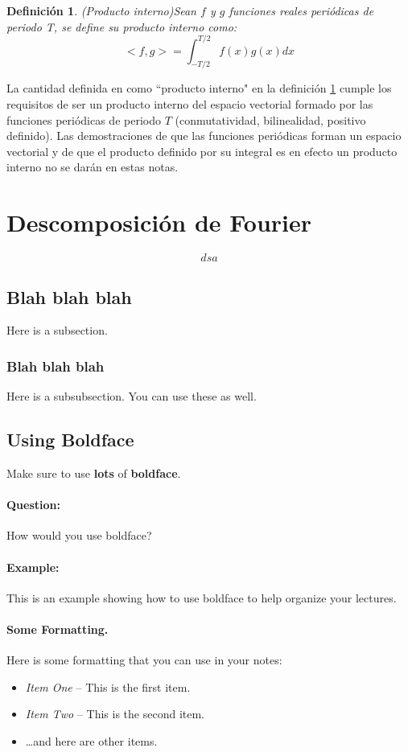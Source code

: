 \documentclass[11pt]{article}
\newtheorem{definition}[theorem]{Definición}
\begin{document}
\begin{definition}(Producto interno)\label{producto}
	Sean $f$ y $g$ funciones reales periódicas de periodo T, se define su producto interno como: 
	\[ <f,g> = \int_{-T/2}^{T/2} f(x) g(x) dx \]
\end{definition}

La cantidad definida en como ``producto interno" en la definición \ref{producto} cumple los requisitos de ser un producto interno 
del espacio vectorial formado por las funciones periódicas de periodo $T$ (conmutatividad, bilinealidad, positivo definido). 
Las demostraciones de que las funciones periódicas forman un espacio vectorial 
y de que el producto definido por su integral es en efecto un producto interno 
no se darán en estas notas.

\section{Descomposición de Fourier}

\begin{equation}
	dsa
\end{equation}


\subsection{Blah blah blah}
Here is a subsection.

\subsubsection{Blah blah blah}
Here is a subsubsection. You can use these as well.

\subsection{Using Boldface}
Make sure to use \textbf{lots} of {\bf boldface}.

\paragraph{Question:}
How would you use boldface?

\paragraph{Example:}
This is an example showing how to use boldface to 
help organize your lectures.


\paragraph{Some Formatting.}
Here is some formatting that you can use in your notes:
\begin{itemize}
\item {\em Item One} -- This is the first item.
\item {\em Item Two} -- This is the second item.
\item \dots and here are other items.
\end{itemize}
\end{document}
